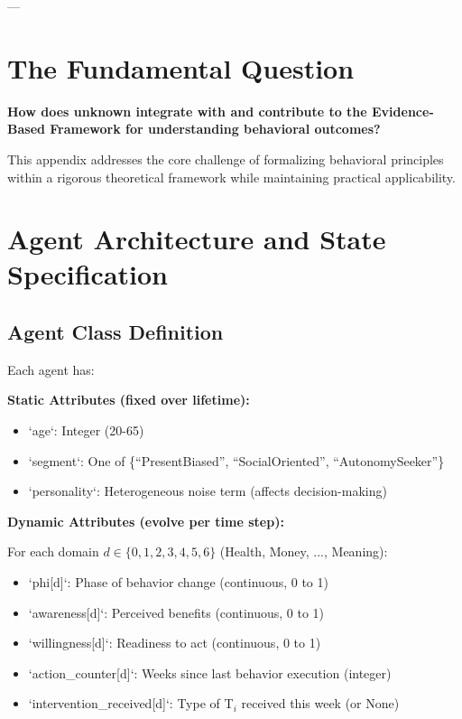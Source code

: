 ---


\section{The Fundamental Question}
\label{sec:ppp-fundamental}

\begin{tcolorbox}[
    colback=red!5!white,
    colframe=red!75!black,
    title={\textbf{Fundamental Question}}
]
\textbf{How does unknown integrate with and contribute to the
Evidence-Based Framework for understanding behavioral outcomes?}

This appendix addresses the core challenge of formalizing behavioral principles
within a rigorous theoretical framework while maintaining practical applicability.
\end{tcolorbox}


\section{Agent Architecture and State Specification}
\label{ppp:agent}

\subsection{Agent Class Definition}

Each agent has:

\textbf{Static Attributes (fixed over lifetime):}
\begin{itemize}[nosep]
\item `age`: Integer (20-65)
\item `segment`: One of \{``PresentBiased'', ``SocialOriented'', ``AutonomySeeker''\}
\item `personality`: Heterogeneous noise term (affects decision-making)
\end{itemize}

\textbf{Dynamic Attributes (evolve per time step):}

For each domain $d \in \{0,1,2,3,4,5,6\}$ (Health, Money, ..., Meaning):

\begin{itemize}[nosep]
\item `phi[d]`: Phase of behavior change (continuous, 0 to 1)
\item `awareness[d]`: Perceived benefits (continuous, 0 to 1)
\item `willingness[d]`: Readiness to act (continuous, 0 to 1)
\item `action_counter[d]`: Weeks since last behavior execution (integer)
\item `intervention_received[d]`: Type of T$_i$ received this week (or None)
\end{itemize}

